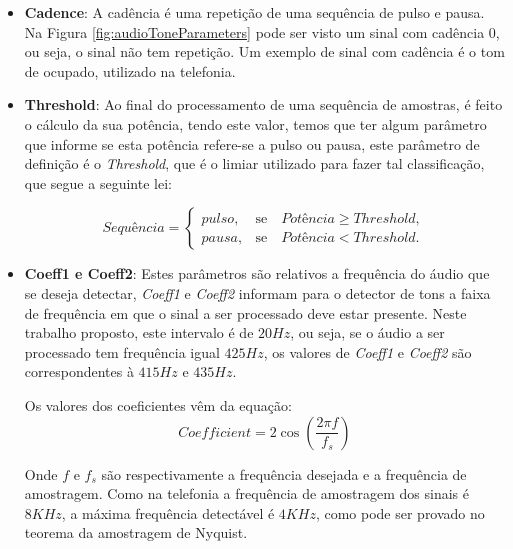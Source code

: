 \documentclass[monografia]{subfiles}
\begin{document}
	\begin{itemize}
	\item \textbf{Cadence}: 
		A cadência é uma repetição de uma sequência de pulso e pausa. Na Figura \ref{fig:audioToneParameters} pode ser visto um sinal com cadência 0,
		ou seja, o sinal não tem repetição. Um exemplo de sinal com cadência é o tom de ocupado, utilizado na telefonia.
	\end{itemize}

	\begin{itemize}
	\item \textbf{Threshold}: Ao final do processamento de uma sequência de amostras, é feito o cálculo da sua potência, tendo este valor,
		temos que ter algum parâmetro que informe se esta potência refere-se a pulso ou pausa, este parâmetro de definição é o \textit{Threshold},
		que é o limiar utilizado para fazer tal classificação, que segue a seguinte lei:

			\begin{equation}
				\textit{Sequência} = \left\{\begin{array}{rc}
				pulso,&\mbox{se}\quad \textit{Potência} \ge Threshold,\\
				pausa, &\mbox{se}\quad \textit{Potência} < Threshold.
				\end{array}\right.
				\label{eq:ThresholdParameters}
			\end{equation}
	\end{itemize}

	\begin{itemize}
	\item \textbf{Coeff1 e Coeff2}:
		Estes parâmetros são relativos a frequência do áudio que se deseja detectar, \textit{Coeff1} e \textit{Coeff2} 
		informam para o detector de tons a faixa de frequência em que o sinal a ser processado deve estar presente. Neste trabalho proposto, 
		este intervalo é de $20 Hz$, ou seja, se o áudio a ser processado tem frequência igual $425 Hz$, os valores de \textit{Coeff1} e \textit{Coeff2}
		são correspondentes à $415 Hz$ e $435 Hz$. 

		Os valores dos coeficientes vêm da equação:
		\begin{equation}
			Coefficient = 2 \cos {\left ( \frac{2\pi f }{f_s} \right )}
			\label{eq:coeffCalc}
		\end{equation}

		Onde $f$ e $f_s$ são respectivamente a frequência desejada e a frequência de amostragem. Como na telefonia a frequência de amostragem dos
		sinais é $8 KHz$, a máxima frequência detectável é $4 KHz$, como pode ser provado no teorema da amostragem de Nyquist.
	\end{itemize}
\end{document}
